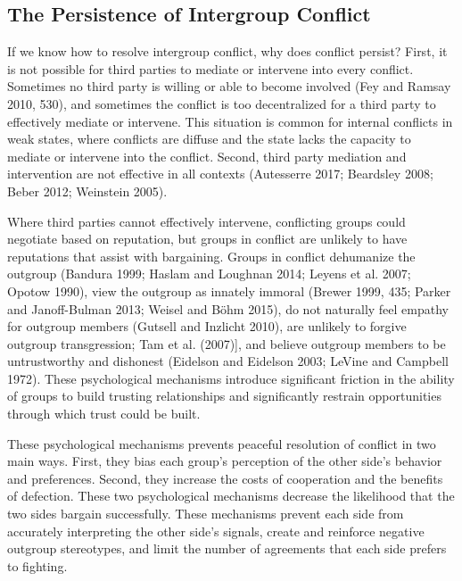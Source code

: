 \documentclass[11pt]{article}
\begin{document}
\hypertarget{the-persistence-of-intergroup-conflict}{%
\subsection{The Persistence of Intergroup
Conflict}\label{the-persistence-of-intergroup-conflict}}

If we know how to resolve intergroup conflict, why does conflict
persist? First, it is not possible for third parties to mediate or
intervene into every conflict. Sometimes no third party is willing or
able to become involved (Fey and Ramsay 2010, 530), and sometimes the
conflict is too decentralized for a third party to effectively mediate
or intervene. This situation is common for internal conflicts in weak
states, where conflicts are diffuse and the state lacks the capacity to
mediate or intervene into the conflict. Second, third party mediation
and intervention are not effective in all contexts (Autesserre 2017;
Beardsley 2008; Beber 2012; Weinstein 2005).

Where third parties cannot effectively intervene, conflicting groups
could negotiate based on reputation, but groups in conflict are unlikely
to have reputations that assist with bargaining. Groups in conflict
dehumanize the outgroup (Bandura 1999; Haslam and Loughnan 2014; Leyens
et al. 2007; Opotow 1990), view the outgroup as innately immoral (Brewer
1999, 435; Parker and Janoff-Bulman 2013; Weisel and Böhm 2015), do not
naturally feel empathy for outgroup members (Gutsell and Inzlicht 2010),
are unlikely to forgive outgroup transgression; Tam et al. (2007){]},
and believe outgroup members to be untrustworthy and dishonest (Eidelson
and Eidelson 2003; LeVine and Campbell 1972). These psychological
mechanisms introduce significant friction in the ability of groups to
build trusting relationships and significantly restrain opportunities
through which trust could be built.

These psychological mechanisms prevents peaceful resolution of conflict
in two main ways. First, they bias each group's perception of the other
side's behavior and preferences. Second, they increase the costs of
cooperation and the benefits of defection. These two psychological
mechanisms decrease the likelihood that the two sides bargain
successfully. These mechanisms prevent each side from accurately
interpreting the other side's signals, create and reinforce negative
outgroup stereotypes, and limit the number of agreements that each side
prefers to fighting.
\end{document}
